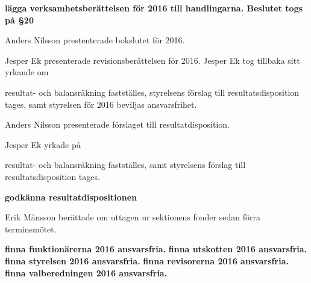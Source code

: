 \documentclass[10pt]{article}
\begin{document}
	\begin{paragrafer} \item[] %
	\begin{paragrafer}
\end{paragrafer}

\textbf{\Mba lägga verksamhetsberättelsen för 2016 till handlingarna. Beslutet togs på \S20}

Anders Nilsson prestenterade bokslutet för 2016.

Jesper Ek presenterade revisionsberättelsen för 2016.
Jesper Ek tog tillbaka sitt yrkande om
\begin{attsatser}
    \att resultat- och balansräkning fastställes,
    \att styrelsens förslag till resultatsdisposition tages, samt
    \att styrelsen för 2016 beviljas ansvarsfrihet.
\end{attsatser}

Anders Nilsson presenterade förslaget till resultatdisposition.

Jesper Ek yrkade på
\begin{attsatser}
    \att resultat- och balansräkning fastställes, samt
    \att styrelsens förslag till resultatsdisposition tages.
\end{attsatser}

\Mbaby

\textbf{\Mba godkänna resultatdispositionen}

Erik Månsson berättade om uttagen ur sektionens fonder sedan förra terminsmötet.

    \begin{paragrafer}
        \textbf{\Mba finna funktionärerna 2016 ansvarsfria.}
        \textbf{\Mba finna utskotten 2016 ansvarsfria.}
        \textbf{\Mba finna styrelsen 2016 ansvarsfria.}
        \textbf{\Mba finna revisorerna 2016 ansvarsfria.}
        \textbf{\Mba finna valberedningen 2016 ansvarsfria.}


\end{paragrafer}
\end{paragrafer}
\end{document}
